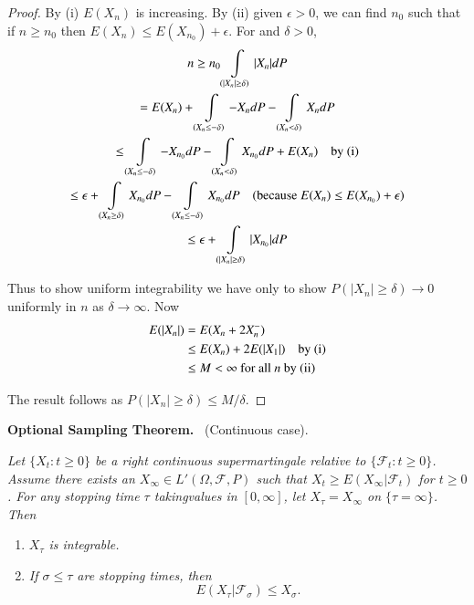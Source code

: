 \begin{proof}
By (i) $E(X_{n})$ is increasing. By (ii) given $\epsilon>0$, we can
find $n_{0}$ such that if $n\geq n_{0}$ then $E(X_{n})\leq
E(X_{n_{0}})+\epsilon$. For and $\delta>0$,
\begin{gather*}
n\geq n_{0}\int\limits_{(|X_{n}|\geq \delta)}|X_{n}|dP\\
=E(X_{n})+\int\limits_{(X_{n}\leq
  -\delta)}-X_{n}dP-\int\limits_{(X_{n}<\delta)}X_{n}dP\\
\leq \int\limits_{(X_{n}\leq
  -\delta)}-X_{n_{0}}dP-\int\limits_{(X_{n}<\delta)}X_{n_{0}}dP+E(X_{n})\quad\text{by
  (i)}\\ 
\leq \epsilon +\int\limits_{(X_{n}\geq
  \delta)}X_{n_{0}}dP-\int\limits_{(X_{n}\leq
  -\delta)}X_{n_{0}}dP\quad(\text{because~ } E(X_{n})\leq
E(X_{n_{0}})+\epsilon)\\
\leq \epsilon+\int\limits_{(|X_{n}|\geq \delta)}|X_{n_{0}}|dP
\end{gather*}

Thus to show uniform integrability we have only to show $P(|X_{n}|\geq
\delta)\to 0$ uniformly in $n$ as $\delta\to \infty$. Now
\begin{align*}
E(|X_{n}|) &= E(X_{n}+2X^{-}_{n})\\
&\leq E(X_{n})+2E(|X_{1}|)\quad\text{by~ (i)}\\
&\leq M<\infty\text{~ for all~ } n\text{~ by (ii)}
\end{align*}

The result follows as $P(|X_{n}|\geq \delta)\leq M/\delta$.
\end{proof}

\noindent
{\bf Optional Sampling Theorem.}~ (Continuous case).
\smallskip

{\em Let $\{X_{t}:t\geq 0\}$ be a right continuous supermartingale
  relative to $\{\mathscr{F}_{t}:t\geq 0\}$. Assume there exists an
  $X_{\infty}\in L'(\Omega,\mathscr{F},P)$ such that $X_{t}\geq
  E(X_{\infty}|\mathscr{F}_{t})$ for $t\geq 0$. For any stopping time
  $\tau$ taking\pageoriginale values in $[0,\infty]$, let
  $X_{\tau}=X_{\infty}$ on $\{\tau=\infty\}$. Then}
\begin{enumerate}
\renewcommand{\theenumi}{\roman{enumi}}
\renewcommand{\labelenumi}{(\theenumi)}
\item {\em $X_{\tau}$ is integrable.}


\item {\em If $\sigma\leq \tau$ are stopping times, then}
$$
E(X_{\tau}|\mathscr{F}_{\sigma})\leq X_{\sigma}.
$$
\end{enumerate}

